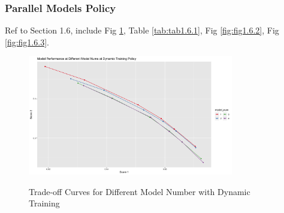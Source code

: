 \documentclass{article}
\begin{document}
\subsubsection{Parallel Models Policy}
Ref to Section 1.6, include Fig \ref{fig:fig1.6.1}, Table \ref{tab:tab1.6.1}, Fig \ref{fig:fig1.6.2}, Fig \ref{fig:fig1.6.3}.

\begin{figure}
    \caption{Trade-off Curves for Different Model Number with Dynamic Training}
    \centering
    \includegraphics[width = 0.8\textwidth]{images/ModelPerformanceatDifferentModelNumsatDynamicTrainingPolicy.png}
    \label{fig:fig1.6.1}
\end{figure}
\end{document}
